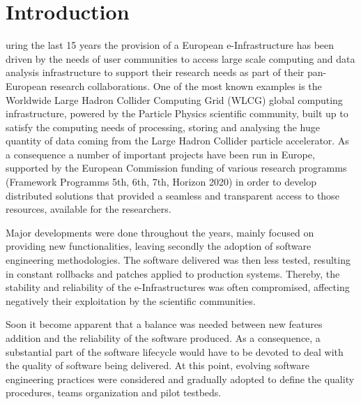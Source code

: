 \documentclass[journal]{IEEEtran}
\begin{document}
\IEEEpeerreviewmaketitle

\section{Introduction}



uring the last 15 years the provision of a European e-Infrastructure 
has been driven by the needs of user communities to access large scale computing and 
data analysis infrastructure to support their research needs as part of their 
pan-European research collaborations. One of the most known examples is the Worldwide 
Large Hadron Collider Computing Grid (WLCG) global computing infrastructure, powered 
by the Particle Physics scientific community, built up to satisfy the computing needs
of processing, storing and analysing the huge quantity of data coming from the Large 
Hadron Collider particle accelerator. As a consequence a number of important projects 
have been run in Europe, supported by the European Commission funding of various 
research programms (Framework Programms 5th, 6th, 7th, Horizon 2020) in order to
develop distributed solutions that provided a seamless and transparent access to those 
resources, available for the researchers.

Major developments were done throughout the years, mainly focused on providing new
functionalities, leaving secondly the adoption of software engineering methodologies.
The software delivered was then less tested, resulting in constant
rollbacks and patches applied to production systems. Thereby, the stability and
reliability of the e-Infrastructures was often compromised, affecting
negatively their exploitation by the scientific communities.

Soon it become apparent that a balance was needed between new features addition
and the reliability of the software produced. As a consequence, a substantial part of the
software lifecycle would have to be devoted to deal with the quality of software being
delivered. At this point, evolving software engineering practices were
considered and gradually adopted to define the quality procedures, teams
organization and pilot testbeds.
\end{document}
